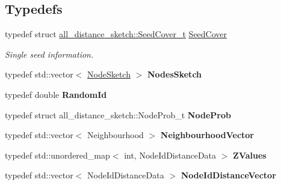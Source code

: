 \subsection*{Typedefs}
\begin{DoxyCompactItemize}
\item 
typedef struct \hyperlink{structall__distance__sketch_1_1SeedCover__t}{all\+\_\+distance\+\_\+sketch\+::\+Seed\+Cover\+\_\+t} \hyperlink{namespaceall__distance__sketch_a2c159e46ed1a101b68cb2b23a58c4129}{Seed\+Cover}
\begin{DoxyCompactList}\small\item\em Single seed information. \end{DoxyCompactList}\item 
\hypertarget{namespaceall__distance__sketch_aa6fb9f0cba2c34476603e744606c5d6a}{}typedef std\+::vector$<$ \hyperlink{classall__distance__sketch_1_1NodeSketch}{Node\+Sketch} $>$ {\bfseries Nodes\+Sketch}\label{namespaceall__distance__sketch_aa6fb9f0cba2c34476603e744606c5d6a}

\item 
\hypertarget{namespaceall__distance__sketch_a07dc7ca615a83c4e656f52297eda4bb4}{}typedef double {\bfseries Random\+Id}\label{namespaceall__distance__sketch_a07dc7ca615a83c4e656f52297eda4bb4}

\item 
\hypertarget{namespaceall__distance__sketch_afe1012f59c9acefad48d9c8b254f62da}{}typedef struct all\+\_\+distance\+\_\+sketch\+::\+Node\+Prob\+\_\+t {\bfseries Node\+Prob}\label{namespaceall__distance__sketch_afe1012f59c9acefad48d9c8b254f62da}

\item 
\hypertarget{namespaceall__distance__sketch_a1b6c1bccb4c2618347ee06c820a5ab9d}{}typedef std\+::vector$<$ Neighbourhood $>$ {\bfseries Neighbourhood\+Vector}\label{namespaceall__distance__sketch_a1b6c1bccb4c2618347ee06c820a5ab9d}

\item 
\hypertarget{namespaceall__distance__sketch_a60854de6ec0a7d77c5e111cce0c2f1fd}{}typedef std\+::unordered\+\_\+map$<$ int, Node\+Id\+Distance\+Data $>$ {\bfseries Z\+Values}\label{namespaceall__distance__sketch_a60854de6ec0a7d77c5e111cce0c2f1fd}

\item 
\hypertarget{namespaceall__distance__sketch_a21b129900de9d9cfbb3406f7e0d1a75a}{}typedef std\+::vector$<$ Node\+Id\+Distance\+Data $>$ {\bfseries Node\+Id\+Distance\+Vector}\label{namespaceall__distance__sketch_a21b129900de9d9cfbb3406f7e0d1a75a}


\end{DoxyCompactItemize}
